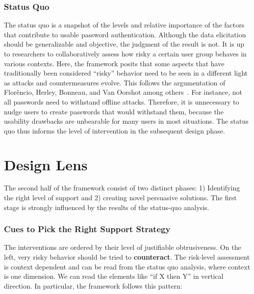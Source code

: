 \subsubsection{Status Quo}
The status quo is a snapshot of the levels and relative importance of the factors that contribute to usable password authentication. Although the data elicitation should be generalizable and objective, the judgment of the result is not. It is up to researchers to collaboratively assess how risky a certain user group behaves in various contexts. Here, the framework posits that some aspects that have traditionally been considered ``risky'' behavior need to be seen in a different light as attacks and countermeasures evolve. This follows the argumentation of Florêncio, Herley, Bonneau, and Van Oorshot among others \cite{Bonneau2012ReplacePasswords,Florencio2016CommACM, Herley2012PersistenceOfPasswords,ZhangKennedy2016RevisitingPasswordRules}. For instance, not all passwords need to withstand offline attacks. Therefore, it is unnecessary to nudge users to create passwords that would withstand them, because the usability drawbacks are unbearable for many users in most situations. The status quo thus informs the level of intervention in the subsequent design phase.

\section{Design Lens}
The second half of the framework consist of two distinct phases: 1) Identifying the right level of support and 2) creating novel persuasive solutions. The first stage is strongly influenced by the results of the status-quo analysis. 

\subsubsection{Cues to Pick the Right Support Strategy} The interventions are ordered by their level of justifiable obtrusiveness. On the left, very risky behavior should be tried to \textbf{counteract}. The risk-level assessment is context dependent and can be read from the status quo analysis, where context is one dimension. We can read the elements like ``if X then Y'' in vertical direction. In particular, the framework follows this pattern:

